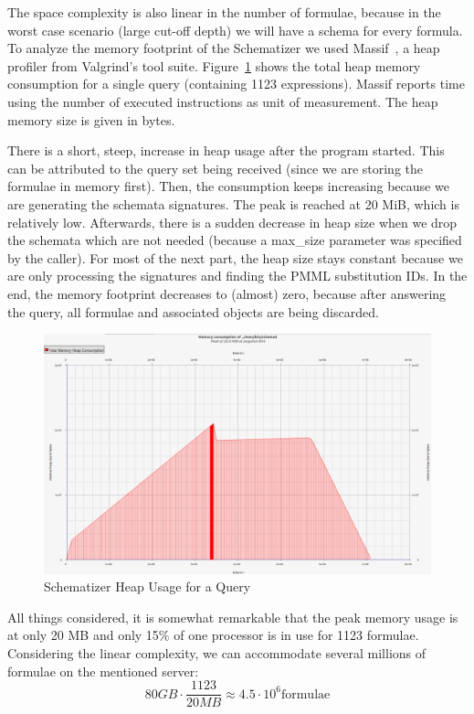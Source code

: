 \documentclass[a4paper,oneside]{article}
\begin{document}
The space complexity is also linear in the number of formulae, because in the
worst case scenario (large cut-off depth) we will have a schema for every
formula. To analyze the memory footprint of the Schematizer we used
Massif~\cite{massif:online}, a heap profiler from Valgrind's tool suite.
Figure~\ref{fig:heap_usage} shows the total heap memory consumption for a
single query (containing 1123 expressions). Massif reports time using the
number of executed instructions as unit of measurement. The heap memory size is
given in bytes.

There is a short, steep, increase in heap usage after the program started. This
can be attributed to the query set being received (since we are storing the
formulae in memory first). Then, the consumption keeps increasing because we
are generating the schemata signatures. The peak is reached at 20 MiB, which is
relatively low. Afterwards, there is a sudden decrease in heap size when we
drop the schemata which are not needed (because a \textsf{max\_size} parameter
was specified by the caller). For most of the next part, the heap size stays
constant because we are only processing the signatures and finding the PMML
substitution IDs. In the end, the memory footprint decreases to (almost) zero,
because after answering the query, all formulae and associated objects are
being discarded.

\begin{figure}[ht]\centering
    \includegraphics[width=12.1cm]{img/heapUsage.png}
    \caption{Schematizer Heap Usage for a Query}\label{fig:heap_usage}
\end{figure}
\FloatBarrier

All things considered, it is somewhat remarkable that the peak memory usage
is at only 20 MB and only 15\% of one processor is in use for 1123 formulae.
Considering the linear complexity, we can accommodate several millions of
formulae on the mentioned server:
$$80 GB \cdot \frac{1123}{20 MB} \approx 4.5 \cdot {10}^{6} \text{formulae}$$
\end{document}
